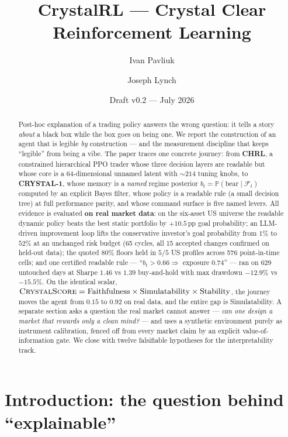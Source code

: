 \documentclass[11pt]{article}
\title{CrystalRL --- Crystal Clear Reinforcement Learning}
\author{Ivan Pavliuk \and Joseph Lynch}
\date{Draft v0.2 --- July 2026}
\newcommand{\Prob}{\mathbb{P}}
\begin{document}
\maketitle

\begin{abstract}
Post-hoc explanation of a trading policy answers the wrong question: it tells a story
\emph{about} a black box while the box goes on being one. We report the construction of an agent
that is legible \emph{by} construction --- and the measurement discipline that keeps ``legible''
from being a vibe. The paper traces one concrete journey: from \textbf{CHRL}, a constrained
hierarchical PPO trader whose three decision layers are readable but whose core is a
64-dimensional unnamed latent with ${\sim}214$ tuning knobs, to \textbf{CRYSTAL-1}, whose memory
is a \emph{named} regime posterior $b_t = \Prob(\text{bear} \mid \mathcal{F}_t)$ computed by an
explicit Bayes filter, whose policy is a readable rule (a small decision tree) at full
performance parity, and whose command surface is five named levers. All evidence is evaluated
\textbf{on real market data}: on the six-asset US universe the readable dynamic policy beats the
best static portfolio by $+10.5$\,pp goal probability; an LLM-driven improvement loop lifts the
conservative investor's goal probability from $1\%$ to $52\%$ at an unchanged risk budget (65
cycles, all 15 accepted changes confirmed on held-out data); the quoted $80\%$ floors held in
$5/5$ US profiles across 576 point-in-time cells; and one certified readable rule ---
``$b_t > 0.66 \Rightarrow$ exposure $0.74$'' --- ran on 629 untouched days at Sharpe $1.46$ vs
$1.39$ buy-and-hold with max drawdown $-12.9\%$ vs $-15.5\%$. On the identical scalar,
$\textsc{CrystalScore} = \text{Faithfulness}\times\text{Simulatability}\times\text{Stability}$,
the journey moves the agent from $0.15$ to $0.92$ on real data, and the entire gap is
Simulatability. A separate section asks a question the real market cannot answer --- \emph{can
one design a market that rewards only a clean mind?} --- and uses a synthetic environment purely
as instrument calibration, fenced off from every market claim by an explicit value-of-information
gate. We close with twelve falsifiable hypotheses for the interpretability track.
\end{abstract}

\section{Introduction: the question behind ``explainable''}
\label{sec:intro}
\end{document}
